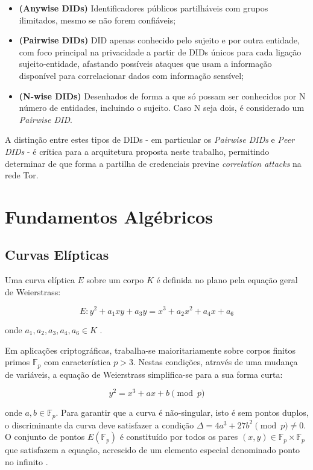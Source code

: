 \begin{itemize}
    \item \textbf{(Anywise DIDs)} Identificadores públicos partilháveis com grupos ilimitados, mesmo se não forem confiáveis;
    \item \textbf{(Pairwise DIDs)} DID apenas conhecido pelo sujeito e por outra entidade, com foco principal na privacidade a partir de DIDs únicos para cada ligação sujeito-entidade, afastando possíveis ataques que usam a informação disponível para correlacionar dados com informação sensível;
    \item \textbf{(N-wise DIDs)} Desenhados de forma a que só possam ser conhecidos por N número de entidades, incluindo o sujeito. Caso N seja dois, é considerado um \textit{Pairwise DID}.
\end{itemize}

A distinção entre estes tipos de DIDs - em particular os \textit{Pairwise DIDs} e \textit{Peer DIDs} - é crítica para a arquitetura proposta neste trabalho, permitindo determinar de que forma a partilha de credenciais previne \textit{correlation attacks} na rede Tor.

\section{Fundamentos Algébricos}

\subsection{Curvas Elípticas}

Uma curva elíptica $E$ sobre um corpo $K$ é definida no plano pela equação geral de Weierstrass:

\begin{equation*}
    E : y^2 + a_1xy + a_3y = x^3 + a_2x^2 + a_4x + a_6
\end{equation*}

onde $a_1, a_2, a_3, a_4, a_6 \in K$ \cite{hankerson2004guide}.

Em aplicações criptográficas, trabalha-se maioritariamente sobre corpos finitos primos $\mathbb{F}_p$ com característica $p>3$. Nestas condições, através de uma mudança de variáveis, a equação de Weierstrass simplifica-se para a sua forma curta:

\begin{equation*}
    y^2 = x^3 + ax + b \pmod{p}
\end{equation*}

onde $a, b \in \mathbb{F}_p$. Para garantir que a curva é não-singular, isto é sem pontos duplos, o discriminante da curva deve satisfazer a condição $\Delta = 4a^3 + 27b^2 \pmod{p} \neq 0$. O conjunto de pontos $E(\mathbb{F}_p)$ é constituído por todos os pares $(x,y) \in \mathbb{F}_p \times \mathbb{F}_p$ que satisfazem a equação, acrescido de um elemento especial denominado ponto no infinito \cite{portnoi_ecc}.

